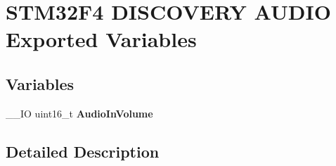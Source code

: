 \hypertarget{group___s_t_m32_f4___d_i_s_c_o_v_e_r_y___a_u_d_i_o___exported___variables}{}\section{S\+T\+M32\+F4 D\+I\+S\+C\+O\+V\+E\+RY A\+U\+D\+IO Exported Variables}
\label{group___s_t_m32_f4___d_i_s_c_o_v_e_r_y___a_u_d_i_o___exported___variables}
\subsection*{Variables}
\begin{DoxyCompactItemize}
\item 
\mbox{\label{group___s_t_m32_f4___d_i_s_c_o_v_e_r_y___a_u_d_i_o___exported___variables_gaa7ea32df300b1ecd063e28c21da56076}} 
\+\_\+\+\_\+\+IO uint16\+\_\+t {\bfseries Audio\+In\+Volume}
\end{DoxyCompactItemize}


\subsection{Detailed Description}
